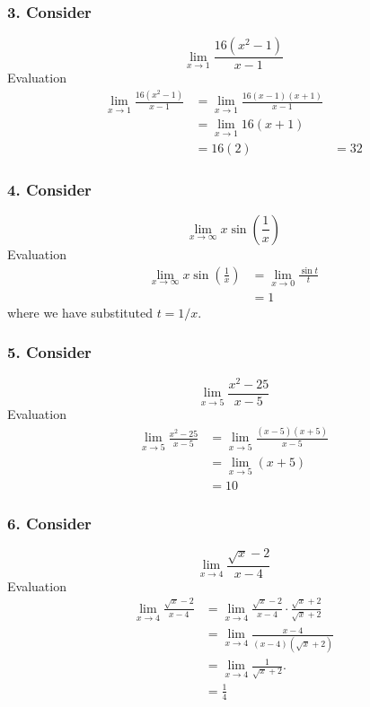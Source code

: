 \documentclass[../../../main.tex]{subfiles}
\begin{document}
\subsubsection{3. Consider}
\begin{equation*}
    \lim_{x \to 1} \frac{16 (x^2-1)}{x-1}
\end{equation*}
Evaluation
\begin{align*}
    \lim_{x \to 1} \frac{16(x^{2} - 1)}{x - 1}
&= \lim_{x \to 1} \frac{16(x - 1)(x + 1)}{x - 1} \\
&= \lim_{x \to 1} 16(x + 1) \\
&= 16(2) 
&= 32
\end{align*}
\subsubsection{4. Consider}
\begin{equation*}
    \lim_{x \to \infty} x \sin\!\left(\frac{1}{x}\right)    
\end{equation*}
Evaluation
\begin{align*}
    \lim_{x \to \infty} x \sin\!\left(\frac{1}{x}\right)
     & = \lim_{x \to 0} \frac{\sin t}{t} \\
     & = 1
\end{align*}
where we have substituted $t=1/x$.

\subsubsection{5. Consider}
\begin{equation*}
    \lim_{x\to5} \frac{x^2-25 }{x-5}
\end{equation*}
Evaluation
\begin{align*}
    \lim_{x \to 5} \frac{x^{2} - 25}{x - 5}
&= \lim_{x \to 5} \frac{(x - 5)(x + 5)}{x - 5} \\
&= \lim_{x \to 5} (x + 5) \\
&= 10
\end{align*}

\subsubsection{6. Consider}
\begin{equation*}
    \lim_{x\to4}\frac{\sqrt{x}-2 }{x-4}
\end{equation*}
Evaluation
\begin{align*}
    \lim_{x\to4}\frac{\sqrt{x}-2 }{x-4}&= \lim_{x\to4}\frac{\sqrt{x} - 2}{x - 4} \cdot \frac{\sqrt{x} + 2}{\sqrt{x} + 2} \\
&=\lim_{x\to4} \frac{x - 4}{(x - 4)(\sqrt{x} + 2)} \\
&=\lim_{x\to4}\frac{1}{\sqrt{x} + 2}. \\
&= \frac{1 }{4}
\end{align*}
\end{document}
